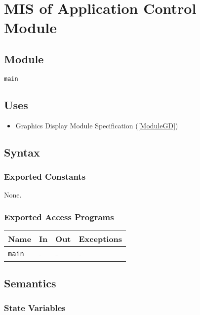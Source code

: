 \documentclass[12pt, titlepage]{article}
\def\code#1{\texttt{#1}}
\begin{document}
\newpage

\section{MIS of Application Control Module} \label{ModuleAC} 

\subsection{Module}

\code{main} 

\subsection{Uses}

\begin{itemize}
  \item Graphics Display Module Specification (\ref{ModuleGD})
\end{itemize}

\subsection{Syntax}

\subsubsection{Exported Constants}

None.

\subsubsection{Exported Access Programs}

\begin{center}
\begin{tabular}{p{2cm} p{4cm} p{4cm} p{2cm}}
\hline
\textbf{Name} & \textbf{In} & \textbf{Out} & \textbf{Exceptions} \\
\hline
\code{main} & - & - & - \\
\hline
\end{tabular}
\end{center}

\subsection{Semantics}

\subsubsection{State Variables}
\end{document}
